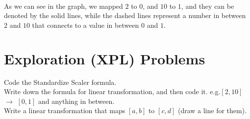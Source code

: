 \begin{outline}[enumerate]
\begin{center}
 \\
\end{center}

As we can see in the graph, we mapped $2$ to $0$, and $10$ to $1$, and they can be denoted by the solid lines,
while the dashed lines represent a number in between $2$ and $10$ that connects to a value in between $0$ and $1$.

\end{outline}

\section{Exploration (XPL) Problems}
\begin{outline}[enumerate]

    \1  Code the Standardize Scaler formula. \\

    \1  Write down the formula for linear transformation, and then code it. e.g.$[2,10]$ $\rightarrow$ $[0,1]$ and anything in between.\\

    \1 Write a linear transformation that maps $[a,b]$ to $[c,d]$ (draw a line for them). \\

\end{outline}


